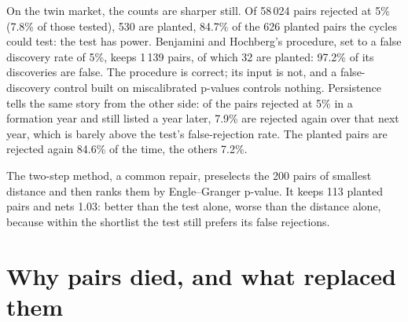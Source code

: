 \begin{omfigure}

\label{fig:s1:pairs-and-baskets:calib}
\end{omfigure}

On the twin market, the counts are sharper still. Of 58\,024 pairs rejected at 5\% (7.8\% of those tested), 530 are planted, 84.7\% of the 626 planted pairs
the cycles could test: the test has power. Benjamini and Hochberg's procedure, set to a false discovery rate of 5\%, keeps 1\,139 pairs, of which 32 are
planted: 97.2\% of its discoveries are false. The procedure is correct; its input is not, and a false-discovery control built on miscalibrated p-values
controls nothing. Persistence tells the same story from the other side: of the pairs rejected at 5\% in a formation year and still listed a year later,
7.9\% are rejected again over that next year, which is barely above the test's false-rejection rate. The planted pairs are rejected again 84.6\% of the time,
the others 7.2\%.

The two-step method, a common repair, preselects the 200 pairs of smallest distance and then ranks them by Engle--Granger p-value. It keeps 113 planted
pairs and nets 1.03: better than the test alone, worse than the distance alone, because within the shortlist the test still prefers its false rejections.

\section{Why pairs died, and what replaced them}


